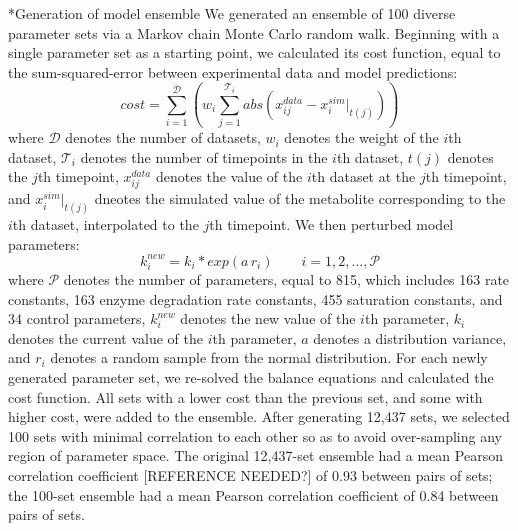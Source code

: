 \documentclass[12pt]{article}
\makeatletter
\renewcommand\subsection{\@startsection
	{subsection}{2}{0mm}
	{-0.05in}
	{-0.5\baselineskip}
	{\normalfont\normalsize\bfseries}}
\makeatother
\begin{document}
\subsection*{Generation of model ensemble}
We generated an ensemble of 100 diverse parameter sets via a Markov chain Monte Carlo random walk.
Beginning with a single parameter set as a starting point, we calculated its cost function, equal to the sum-squared-error between experimental data and model predictions:
\begin{equation}\label{eqn:cost-function}
    cost=\sum_{i=1}^{\mathcal{D}}\left(w_i\sum_{j=1}^{\mathcal{T}_i}abs\left(x_{ij}^{data}-x_{i}^{sim}|_{t(j)}\right)\right)
\end{equation}
where $\mathcal{D}$ denotes the number of datasets, $w_i$ denotes the weight of the $i$th dataset, $\mathcal{T}_i$ denotes the number of timepoints in the $i$th dataset, $t(j)$ denotes the $j$th timepoint, $x_{ij}^{data}$ denotes the value of the $i$th dataset at the $j$th timepoint, and $x_{i}^{sim}|_{t(j)}$ dneotes the simulated value of the metabolite corresponding to the $i$th dataset, interpolated to the $j$th timepoint.
We then perturbed model parameters:
\begin{equation}\label{eqn:parameter-perturbation}
    k_i^{new}=k_i*exp(a\,r_i)\qquad{i=1,2,\hdots,\mathcal{P}}
\end{equation}
where $\mathcal{P}$ denotes the number of parameters, equal to 815, which includes 163 rate constants, 163 enzyme degradation rate constants, 455 saturation constants, and 34 control parameters, $k_i^{new}$ denotes the new value of the $i$th parameter, $k_i$ denotes the current value of the $i$th parameter, $a$ denotes a distribution variance, and $r_i$ denotes a random sample from the normal distribution.
For each newly generated parameter set, we re-solved the balance equations and calculated the cost function.
All sets with a lower cost than the previous set, and some with higher cost, were added to the ensemble.
After generating 12,437 sets, we selected 100 sets with minimal correlation to each other so as to avoid over-sampling any region of parameter space.
The original 12,437-set ensemble had a mean Pearson correlation coefficient [REFERENCE NEEDED?] of 0.93 between pairs of sets; the 100-set ensemble had a mean Pearson correlation coefficient of 0.84 between pairs of sets.
\end{document}
